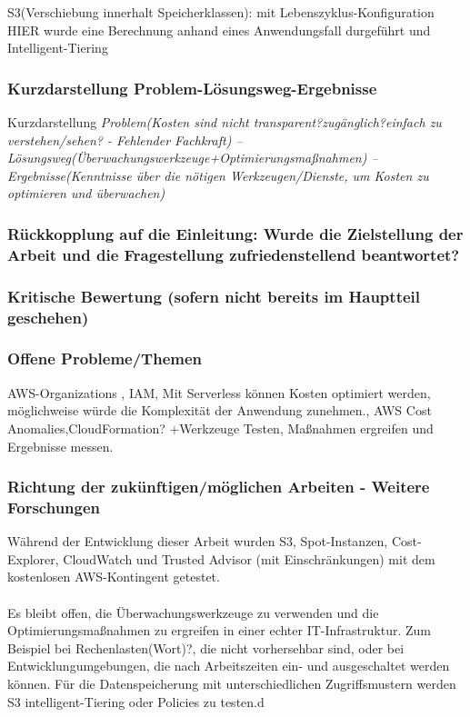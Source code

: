 S3(Verschiebung innerhalt Speicherklassen): mit Lebenszyklus-Konfiguration HIER wurde eine Berechnung anhand eines Anwendungsfall durgeführt und Intelligent-Tiering
\\
\subsubsection*{Kurzdarstellung Problem-Lösungsweg-Ergebnisse}
Kurzdarstellung \textit{Problem(Kosten sind nicht transparent?zugänglich?einfach zu verstehen/sehen? - Fehlender Fachkraft) –  Lösungsweg(Überwachungswerkzeuge+Optimierungsmaßnahmen) – Ergebnisse(Kenntnisse über die nötigen Werkzeugen/Dienste, um Kosten zu optimieren und überwachen)}
\\
\subsubsection*{Rückkopplung auf die Einleitung: Wurde die Zielstellung der Arbeit und die Fragestellung zufriedenstellend beantwortet?}
\subsubsection*{Kritische Bewertung (sofern nicht bereits im Hauptteil geschehen)}
\subsubsection*{Offene Probleme/Themen}
AWS-Organizations%
, IAM, Mit Serverless können Kosten optimiert werden, möglichweise würde die Komplexität der Anwendung zunehmen.,  AWS Cost Anomalies,CloudFormation?
+Werkzeuge Testen, Maßnahmen ergreifen und Ergebnisse messen.
\subsubsection*{Richtung der zukünftigen/möglichen Arbeiten - Weitere Forschungen}
Während der Entwicklung dieser Arbeit wurden S3, Spot-Instanzen, Cost-Explorer, CloudWatch und Trusted Advisor (mit Einschränkungen) mit dem kostenlosen AWS-Kontingent getestet. 
\\\\
Es bleibt offen, die Überwachungswerkzeuge zu verwenden und die Optimierungsmaßnahmen zu ergreifen in einer echter IT-Infrastruktur. 
Zum Beispiel bei Rechenlasten(Wort)?, die nicht vorhersehbar sind, oder bei Entwicklungumgebungen, die nach Arbeitszeiten ein- und ausgeschaltet werden können. Für die Datenspeicherung mit unterschiedlichen Zugriffsmustern werden S3 intelligent-Tiering oder Policies zu testen.d%

